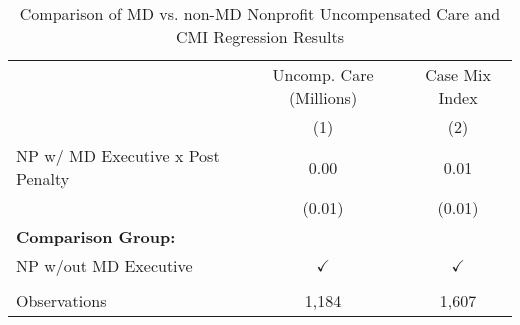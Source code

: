 \begin{table}[htbp]
   \caption{\label{tab:MD_noMD_uncomp_CMI_fullsample} Comparison of MD vs. non-MD Nonprofit Uncompensated Care and CMI Regression Results}
   \bigskip
   \centering
   \begin{tabular}{lcc}
      \toprule
                                        & Uncomp. Care (Millions) & Case Mix Index\\  
                                        & (1)                     & (2)\\  
      \midrule 
      NP w/ MD Executive x Post Penalty & 0.00                    & 0.01\\   
                                        & (0.01)                  & (0.01)\\   
      \textbf{Comparison Group:}        &                         & \\  
      NP w/out MD Executive             & $\checkmark$            & $\checkmark$\\   
       \\
      Observations                      & 1,184                   & 1,607\\  
      \bottomrule
   \end{tabular}
\end{table}
